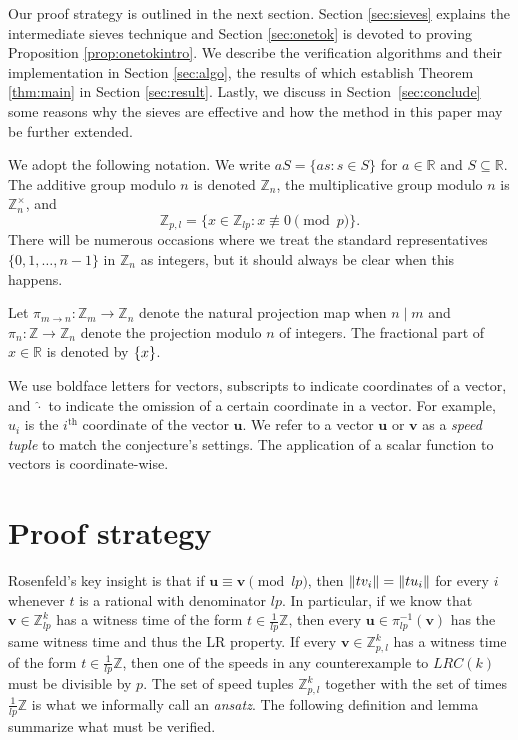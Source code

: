 \documentclass[11pt]{amsart}
\DeclarePairedDelimiter\norm{\lVert}{\rVert}
\DeclarePairedDelimiter\fracpart{\{}{\}}
\newcommand{\Unit}[1]{\Z_{#1}^\times}
\newcommand{\R}{\mathbb{R}}
\newcommand{\Z}{\mathbb{Z}}
\newcommand{\vbf}{\mathbf{v}}
\newcommand{\ubf}{\mathbf{u}}
\theoremstyle{definition}
\theoremstyle{remark}
\begin{document}
Our proof strategy is outlined in the next section. Section \ref{sec:sieves} explains the intermediate sieves 
technique and Section \ref{sec:onetok} is devoted to proving Proposition \ref{prop:onetokintro}. 
We describe the verification algorithms and their implementation in Section \ref{sec:algo}, 
the results of which establish Theorem \ref{thm:main} in Section \ref{sec:result}.
Lastly, we discuss in Section~\ref{sec:conclude} some reasons why the sieves are effective and how the method in this paper may be further extended.

We adopt the following notation. We write $aS=\{as:s\in S\}$ for $a\in\R$ and $S\subseteq\R$. 
The additive group modulo $n$ is denoted $\Z_{n}$, the multiplicative group modulo $n$ is $\Unit{n}$, and 
\[\Z_{p, l}=\{x\in\Z_{lp}: x\not\equiv0\pmod{p}\}.\]
There will be numerous occasions where we treat the standard representatives $\{0,1,\ldots,n-1\}$ in $\Z_n$ as integers, but it should always be clear when this happens.

Let $\pi_{m \to n}:\Z_{m} \to \Z_{n}$ denote the natural projection map when $n\mid m$
and $\pi_n: \Z \to \Z_{n}$ denote the projection modulo $n$ of integers.
The fractional part of $x\in\R$ is denoted by $\fracpart{x}$.

We use boldface letters for vectors, subscripts to indicate coordinates of a vector, 
and $\widehat{\cdot}$ to indicate the omission of a certain coordinate in a vector. 
For example, $u_i$ is the $i^\text{th}$ coordinate of the vector $\ubf$.
We refer to a vector $\ubf$ or $\vbf$ as a \emph{speed tuple} to match the conjecture's settings. 
The application of a scalar function to vectors is coordinate-wise. 

\section{Proof strategy}

Rosenfeld's \cite{Rosenfeld} key insight is that if $\ubf\equiv\vbf\pmod{lp}$, 
then $\norm{tv_i}=\norm{tu_i}$ for every $i$ whenever $t$ is a rational with denominator $lp$. 
In particular, if we know that $\vbf\in\Z_{lp}^k$ has a witness time of the form $t\in\frac{1}{lp}\Z$,
then every $\ubf\in\pi^{-1}_{lp}(\vbf)$ has the same witness time and thus the LR property.
If every $\vbf\in\Z_{p,l}^k$ has a witness time of the form $t\in\frac{1}{lp}\Z$,
then one of the speeds in any counterexample to $LRC(k)$ must be divisible by $p$. The set of speed tuples $\Z_{p,l}^k$ together with the set of times $\frac{1}{lp}\Z$ is what we informally call an \emph{ansatz}.
The following definition and lemma summarize what must be verified.
\end{document}
